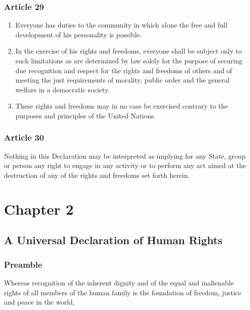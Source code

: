 \documentclass[
  titlepage,
  openright,
  DIV=calc,
  toc=listof,
  listof=nochaptergap]{scrbook}
\begin{document}
\subsection{Article 29}\label{article-29}

\begin{enumerate}
\def\labelenumi{\arabic{enumi}.}
\item
  Everyone has duties to the community in which alone the free and full
  development of his personality is possible.
\item
  In the exercise of his rights and freedoms, everyone shall be subject
  only to such limitations as are determined by law solely for the
  purpose of securing due recognition and respect for the rights and
  freedoms of others and of meeting the just requirements of morality,
  public order and the general welfare in a democratic society.
\item
  These rights and freedoms may in no case be exercised contrary to the
  purposes and principles of the United Nations.
\end{enumerate}

\subsection{Article 30}\label{article-30}

Nothing in this Declaration may be interpreted as implying for any
State, group or person any right to engage in any activity or to perform
any act aimed at the destruction of any of the rights and freedoms set
forth herein.

\chapter{Chapter 2}\label{sec:chapter2}

\section{A Universal Declaration of Human
Rights}\label{a-universal-declaration-of-human-rights-1}

\subsection{Preamble}\label{preamble-1}

Whereas recognition of the inherent dignity and of the equal and
inalienable rights of all members of the human family is the foundation
of freedom, justice and peace in the world,
\end{document}
